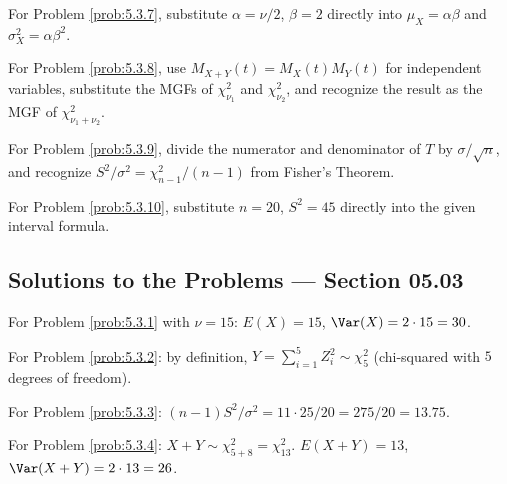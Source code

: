 \begin{sugerencia}
	\label{sug:5.3.7}
	For Problem \ref{prob:5.3.7}, substitute $\alpha=\nu/2$, $\beta=2$ directly into $\mu_X=\alpha\beta$ and $\sigma_X^2=\alpha\beta^2$.
\end{sugerencia}

\begin{sugerencia}
	\label{sug:5.3.8}
	For Problem \ref{prob:5.3.8}, use $M_{X+Y}(t)=M_X(t)M_Y(t)$ for independent variables, substitute the MGFs of $\chi^2_{\nu_1}$ and $\chi^2_{\nu_2}$, and recognize the result as the MGF of $\chi^2_{\nu_1+\nu_2}$.
\end{sugerencia}

\begin{sugerencia}
	\label{sug:5.3.9}
	For Problem \ref{prob:5.3.9}, divide the numerator and denominator of $T$ by $\sigma/\sqrt n$, and recognize $S^2/\sigma^2 = \chi^2_{n-1}/(n-1)$ from Fisher's Theorem.
\end{sugerencia}

\begin{sugerencia}
	\label{sug:5.3.10}
	For Problem \ref{prob:5.3.10}, substitute $n=20$, $S^2=45$ directly into the given interval formula.
\end{sugerencia}

\subsection*{Solutions to the Problems --- Section 05.03}

\begin{solucion}
	\label{sol:5.3.1}
	For Problem \ref{prob:5.3.1} with $\nu=15$: $E(X)=15$, $\Var(X)=2\cdot 15=30$. \quad \qedhere
\end{solucion}

\begin{solucion}
	\label{sol:5.3.2}
	For Problem \ref{prob:5.3.2}: by definition, $Y=\sum_{i=1}^5 Z_i^2 \sim \chi^2_5$ (chi-squared with $5$ degrees of freedom). \quad \qedhere
\end{solucion}

\begin{solucion}
	\label{sol:5.3.3}
	For Problem \ref{prob:5.3.3}: $(n-1)S^2/\sigma^2 = 11\cdot 25/20 = 275/20 = 13.75$. \quad \qedhere
\end{solucion}

\begin{solucion}
	\label{sol:5.3.4}
	For Problem \ref{prob:5.3.4}: $X+Y \sim \chi^2_{5+8} = \chi^2_{13}$. $E(X+Y)=13$, $\Var(X+Y)=2\cdot 13=26$. \quad \qedhere
\end{solucion}

